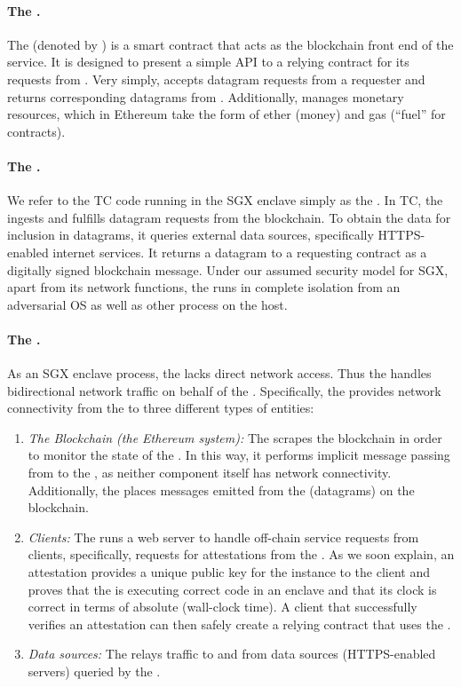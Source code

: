 {\paragraph{The \tcontract \tcont.} The \tcontract (denoted by \tcont) is a smart contract that acts as the blockchain front end of the \tc service. It is designed to present a simple API to a relying contract \reqcont for its requests from \tc. Very simply, \tcont accepts datagram requests from a requester \reqcont and returns corresponding datagrams from \tc. Additionally, \tcont manages \tc monetary resources, which in Ethereum take the form of ether (money) and gas (``fuel'' for contracts).

\paragraph{The \encname \engine.}
We refer to the TC code running in the SGX enclave simply as the \encname. In TC, the \encname ingests and fulfills datagram requests from the blockchain. To obtain the data for inclusion in datagrams, it queries external data sources, specifically HTTPS-enabled internet services. It returns a datagram to a requesting contract \reqcont as a digitally signed blockchain message. Under our assumed security model for SGX, apart from its network functions, the \encname runs in complete isolation from an adversarial OS as well as other process on the host. 

\paragraph{The \medname \relay.} As an SGX enclave process, the \encname lacks direct network access. Thus the \medname handles bidirectional network traffic on behalf of the \encname. Specifically, the \medname provides network connectivity from the \encname to three different types of entities: 

\begin{enumerate}
\item {\em The Blockchain (the Ethereum system):}  The \medname scrapes the blockchain in order to monitor the state of the \tcontract  \tcont. In this way, it performs implicit message passing from \tcont to the \encname, as neither component itself has network connectivity. Additionally, the \medname places messages emitted from the \encname (datagrams) on the blockchain.
\item {\em Clients:} The \medname runs a web server to handle off-chain service requests from clients, specifically, requests for attestations from the \encname. As we soon explain, an attestation provides a unique public key for the \encname instance to the  client and proves that the \encname is executing correct code in an enclave and that its clock is correct in terms of absolute (wall-clock time). A client that successfully verifies an attestation can then safely create a relying contract \reqcont that uses the \tc.
\item {\em Data sources:} The \medname relays traffic to and from data sources (HTTPS-enabled servers) queried by the \encname. 
\end{enumerate}

}
